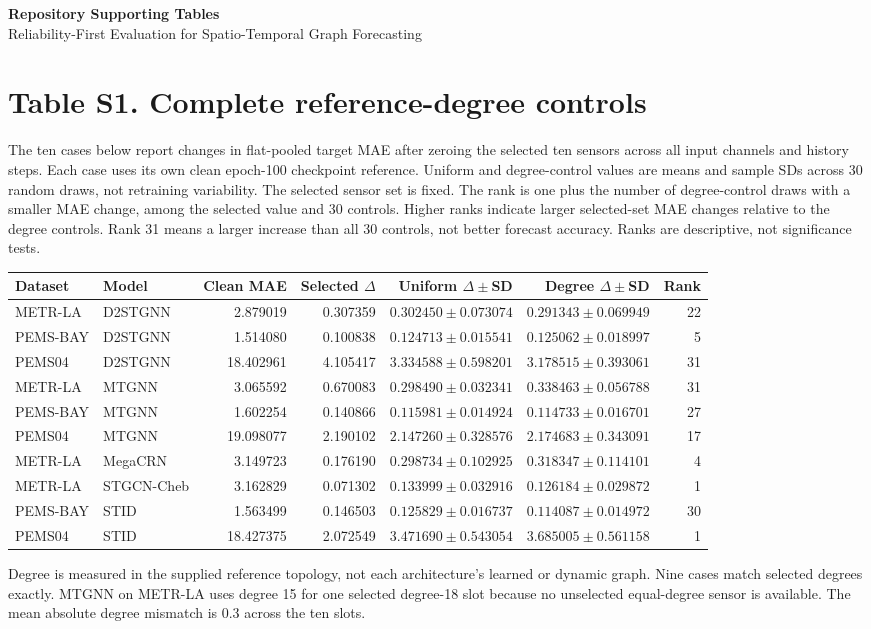 \documentclass[10pt,a4paper]{article}
\begin{document}
\begin{center}
{\large\bfseries Repository Supporting Tables}\\[5pt]
Reliability-First Evaluation for Spatio-Temporal Graph Forecasting
\end{center}
\section*{Table S1. Complete reference-degree controls}
The ten cases below report changes in flat-pooled target MAE after zeroing the
selected ten sensors across all input channels and history steps. Each case uses
its own clean epoch-100 checkpoint reference. Uniform and degree-control values
are means and sample SDs across 30 random draws, not retraining variability.
The selected sensor set is fixed. The rank is one plus the number of degree-control
draws with a smaller MAE change, among the selected value and 30 controls.
Higher ranks indicate larger selected-set MAE changes relative to the degree
controls. Rank 31 means a larger increase than all 30 controls, not better forecast
accuracy. Ranks are descriptive, not significance tests.

\begin{center}\small
\setlength{\tabcolsep}{3pt}
\begin{tabular}{llrrrrr}
\toprule
Dataset & Model & Clean MAE & Selected $\Delta$ & Uniform $\Delta\pm$SD & Degree $\Delta\pm$SD & Rank\\
\midrule
METR-LA & D2STGNN & 2.879019 & 0.307359 & $0.302450\pm0.073074$ & $0.291343\pm0.069949$ & 22 \\
PEMS-BAY & D2STGNN & 1.514080 & 0.100838 & $0.124713\pm0.015541$ & $0.125062\pm0.018997$ & 5 \\
PEMS04 & D2STGNN & 18.402961 & 4.105417 & $3.334588\pm0.598201$ & $3.178515\pm0.393061$ & 31 \\
METR-LA & MTGNN & 3.065592 & 0.670083 & $0.298490\pm0.032341$ & $0.338463\pm0.056788$ & 31 \\
PEMS-BAY & MTGNN & 1.602254 & 0.140866 & $0.115981\pm0.014924$ & $0.114733\pm0.016701$ & 27 \\
PEMS04 & MTGNN & 19.098077 & 2.190102 & $2.147260\pm0.328576$ & $2.174683\pm0.343091$ & 17 \\
METR-LA & MegaCRN & 3.149723 & 0.176190 & $0.298734\pm0.102925$ & $0.318347\pm0.114101$ & 4 \\
METR-LA & STGCN-Cheb & 3.162829 & 0.071302 & $0.133999\pm0.032916$ & $0.126184\pm0.029872$ & 1 \\
PEMS-BAY & STID & 1.563499 & 0.146503 & $0.125829\pm0.016737$ & $0.114087\pm0.014972$ & 30 \\
PEMS04 & STID & 18.427375 & 2.072549 & $3.471690\pm0.543054$ & $3.685005\pm0.561158$ & 1 \\
\bottomrule
\end{tabular}
\end{center}
Degree is measured in the supplied reference topology, not each architecture's
learned or dynamic graph. Nine cases match selected degrees exactly.
MTGNN on METR-LA uses degree 15 for one selected degree-18 slot because no
unselected equal-degree sensor is available. The mean absolute degree mismatch
is 0.3 across the ten slots.
\end{document}
